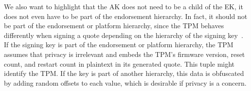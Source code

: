 We also want to highlight that the AK does not need to be a child of the EK, it does not even have to be part of the endorsement hierarchy.
In fact, it should not be part of the endorsement or platform hierarchy, since the TPM behaves differently when signing a quote depending on the hierarchy of the signing key~\cite{tpm20}.
If the signing key is part of the endorsement or platform hierarchy, the TPM assumes that privacy is irrelevant and embeds the TPM's firmware version, reset count, and restart count in plaintext in its generated quote.
This tuple might identify the TPM\@.
If the key is part of another hierarchy, this data is obfuscated by adding random offsets to each value, which is desirable if privacy is a concern.


